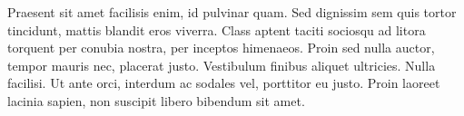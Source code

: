 \begin{anexosenv}
Praesent sit amet facilisis enim, id pulvinar quam. Sed dignissim sem quis tortor tincidunt, mattis blandit eros viverra. Class aptent taciti sociosqu ad litora torquent per conubia nostra, per inceptos himenaeos. Proin sed nulla auctor, tempor mauris nec, placerat justo. Vestibulum finibus aliquet ultricies. Nulla facilisi. Ut ante orci, interdum ac sodales vel, porttitor eu justo. Proin laoreet lacinia sapien, non suscipit libero bibendum sit amet. 



\end{anexosenv}